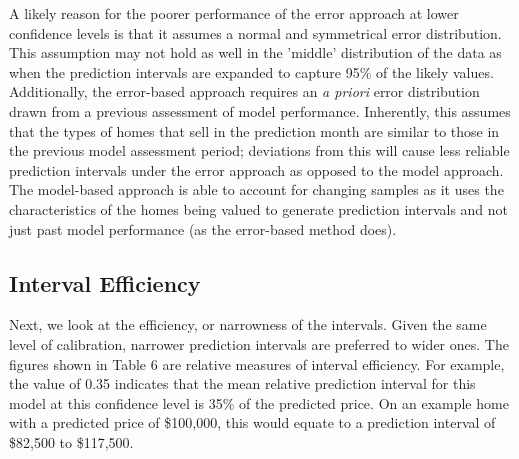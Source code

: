 \documentclass[colTwo]{anon}
\theoremstyle{definition}
\begin{document}
A likely reason for the poorer performance of the error approach at lower confidence levels is that it assumes a normal and symmetrical error distribution. This assumption may not hold as well in the 'middle' distribution of the data as when the prediction intervals are expanded to capture 95\% of the likely values. Additionally, the error-based approach requires an \textit{a priori} error distribution drawn from a previous assessment of model performance.  Inherently, this assumes that the types of homes that sell in the prediction month are similar to those in the previous model assessment period; deviations from this will cause less reliable prediction intervals under the error approach as opposed to the model approach.  The model-based approach is able to account for changing samples as it uses the characteristics of the homes being valued to generate prediction intervals and not just past model performance (as the error-based method does).
\subsection{Interval Efficiency}

Next, we look at the efficiency, or narrowness of the intervals.  Given the same level of calibration, narrower prediction intervals are preferred to wider ones. The figures shown in Table 6 are relative measures of interval efficiency.  For example, the value of 0.35 indicates that the mean relative prediction interval for this model at this confidence level is 35\% of the predicted price. On an example home with a predicted price of \$100,000, this would equate to a prediction interval of \$82,500 to \$117,500.
\end{document}
